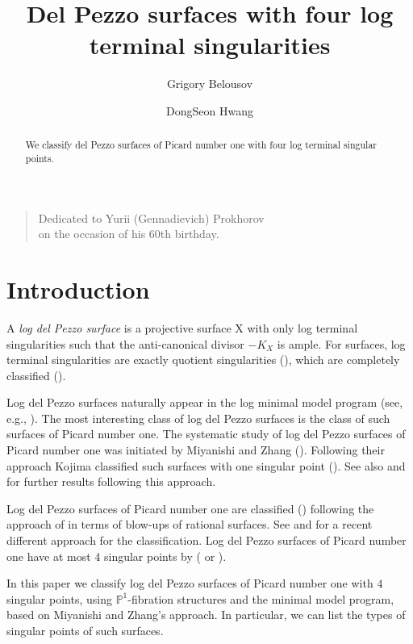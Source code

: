 \documentclass[10pt,oneside,reqno]{amsart}
\newcommand{\pp}{\mathbb{P}}
\theoremstyle{definition}
\theoremstyle{remark}
\numberwithin{equation}{section}
\newenvironment{dedication}
        {\begin{quotation}\begin{center}\begin{em}}
        {\par\end{em}\end{center}\end{quotation}}
\begin{document}
\title{Del Pezzo surfaces with four log terminal singularities}

\author{Grigory Belousov}
\address{Bauman Moscow State Technical University, Moscow, Russia}

\author{DongSeon Hwang}
\address{Center for Complex Geometry, Institute for Basic Science (IBS), Daejeon $34126$, Republic of Korea}
\maketitle
\begin{abstract}
We classify del Pezzo surfaces of Picard number one with four log terminal singular points.
\end{abstract}
\begin{dedication}
Dedicated to Yurii  (Gennadievich) Prokhorov \\ on the occasion of his 60th birthday.
\end{dedication}

\section{Introduction}

A \emph{log del Pezzo surface} is a projective surface X with only
log terminal singularities such that the anti-canonical divisor $-K_X$ is ample. For surfaces, log terminal singularities are exactly quotient singularities (\cite[Corollary 1.9]{K}), which are completely classified  (\cite{Br}).

Log del Pezzo surfaces naturally appear in the log minimal model program
(see, e.g., {\cite{KMM}}). The most interesting class of log del Pezzo surfaces
is the class of such surfaces of Picard number one. The systematic study of log del Pezzo surfaces of Picard number one was initiated by Miyanishi and Zhang (\cite{Zh}). Following their approach Kojima classified such surfaces with one singular point (\cite{Ko}). See also \cite{Zan} and \cite{GZ} for further results following this approach.

Log del Pezzo surfaces of Picard number one are classified (\cite{La}) following the approach of \cite{KeM}  in terms of blow-ups of rational surfaces. See \cite{PP1} and \cite{PP2} for a recent different approach for the classification.  Log del Pezzo surfaces of Picard number one have at most $4$ singular points by  (\cite{B} or \cite{Bel1}).

In this paper we classify log del Pezzo surfaces of Picard number one with $4$ singular points, using $\pp^1$-fibration structures and the minimal model program, based on Miyanishi and Zhang's approach. In particular, we can list the types of singular points of such surfaces.
\end{document}
